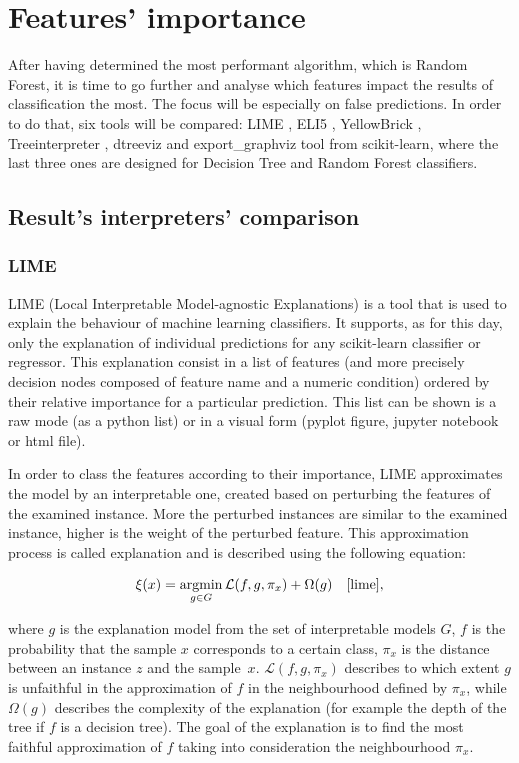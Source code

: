 \chapter{Features' importance}

After having determined the most performant algorithm, which is Random Forest, it is time to go further and analyse which features impact the results of classification the most. The focus will be especially on false predictions. In order to do that, six tools will be compared: LIME \cite{lime}, ELI5 \cite{mikhail_korobov_eli5_nodate}, YellowBrick \cite{bengfort_yellowbrick_2018}, Treeinterpreter \cite{ando_saabas_treeinterpreter_nodate}, dtreeviz \cite{terence_parr_dtreeviz_nodate} and export\_graphviz tool from scikit-learn, where the last three ones are designed for Decision Tree and Random Forest classifiers.

\section{Result's interpreters' comparison}
\subsection{LIME} 
LIME (Local Interpretable Model-agnostic Explanations) is a tool that is used to explain the behaviour of machine learning classifiers. It supports, as for this day, only the explanation of individual predictions for any scikit-learn classifier or regressor. This explanation consist in a list of features (and more precisely decision nodes composed of feature name and a numeric condition) ordered by their relative importance for a particular prediction. This list can be shown is a raw mode (as a python list) or in a visual form (pyplot figure, jupyter notebook or html file).

In order to class the features according to their importance, LIME approximates the model by an interpretable one, created based on perturbing the features of the examined instance. More the perturbed instances are similar to the examined instance, higher is the weight of the perturbed feature. This approximation process is called explanation and is described using the following equation:

\begin{equation}
    \xi(x) = \operatorname*{argmin}_{g \in G} \mathcal{L}(f, g, \pi_x) + \Omega(g)\quad\cite{lime},
\end{equation}

\noindent where $g$ is the explanation model from the set of interpretable models $G$, $f$ is the probability that the sample $x$ corresponds to a certain class, $\pi_x$ is the distance between an instance $z$ and the sample~$x$. $\mathcal{L}(f, g, \pi_x)$ describes to which extent $g$ is unfaithful in the approximation of $f$ in the neighbourhood defined by $\pi_x$, while $\Omega(g)$ describes the complexity of the explanation (for example the depth of the tree if $f$ is a decision tree). The goal of the explanation is to find the most faithful approximation of $f$ taking into consideration the neighbourhood $\pi_x$.

